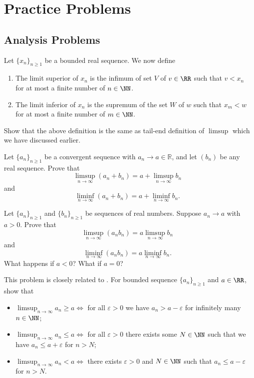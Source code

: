\documentclass[parskip=half, numbers=endperiod, 11pt]{scrartcl}
\begin{document}
\newpage
\section{Practice Problems}

\subsection{Analysis Problems}
\begin{problem}
Let $\{x_n\}_{n \ge 1}$ be a bounded real sequence.
We now define
\begin{enumerate}
	\item The limit superior of $x_n$ is the
	      infimum of set $V$ of $v \in \RR$ such that
	      $v < x_n$ for at most a finite number of
	      $n \in \NN$.

	\item The limit inferior of $x_n$ is the supremum of
	      the set $W$ of $w$ such that $x_m < w$ for at
	      most a finite number of $m \in \NN$.
\end{enumerate}
Show that the above definition is the same as tail-end
definition of $\limsup$ which we have discussed earlier.
\end{problem}

\begin{problem}
Let $\{a_n\}_{n \ge 1}$ be a convergent sequence with $a_n \to a \in \mathbb{R}$, and let $(b_n)$ be any real sequence. Prove that
\[
	\limsup_{n\to\infty} (a_n + b_n) = a + \limsup_{n\to\infty} b_n
\]
and
\[
	\liminf_{n\to\infty} (a_n + b_n) = a + \liminf_{n\to\infty} b_n.
\]
\end{problem}

\begin{problem}
Let $\{a_n\}_{n \ge 1}$ and $\{b_n\}_{n \ge 1}$ be sequences of real numbers. Suppose $a_n \to a$ with $a > 0$. Prove that
\[
	\limsup_{n\to\infty} (a_n b_n) = a \limsup_{n\to\infty} b_n
\]
and
\[
	\liminf_{n\to\infty} (a_n b_n) = a \liminf_{n\to\infty} b_n.
\]
What happens if $a < 0$? What if $a = 0$?
\end{problem}

\begin{problem}
This problem is closely related to . For bounded sequence $\{a_n\}_{n \ge 1}$ and
$a \in \RR$, show that

\begin{itemize}
	\item $\limsup_{n \to \infty} a_n \ge a \iff$ for all
	      $\varepsilon > 0$ we have
	      $a_n > a - \varepsilon$ for infinitely many
	      $n \in \NN$;

	\item $\limsup_{n \to \infty} a_n \le a \iff$ for
	      all $\varepsilon > 0$ there exists some
	      $N \in \NN$ such that we have
	      $a_n \le a + \varepsilon$ for $n > N$;

	\item $\limsup_{n \to \infty} a_n < a \iff$ there
	      exists $\varepsilon > 0$ and $N \in \NN$ such 
		  that $a_n \le a - \varepsilon$ for $n > N$.
\end{itemize}
\end{problem}
\end{document}
